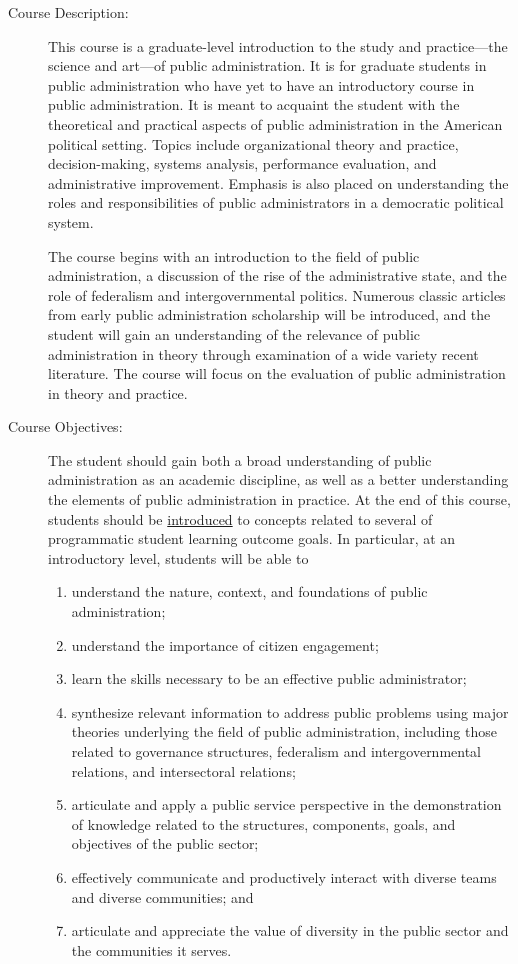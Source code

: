 \documentclass[11pt]{article}
\begin{document}
\maketitle
\begin{description}
	
	\item[Course Description:] This course is a graduate-level introduction to the study and practice---the science and art---of public administration. It is for graduate students in public administration who have yet to have an introductory course in public administration. It is meant to acquaint the student with the theoretical and practical aspects of public administration in the American political setting. Topics include organizational theory and practice, decision-making, systems analysis, performance evaluation, and administrative improvement. Emphasis is also placed on understanding the roles and responsibilities of public administrators in a democratic political system.
	
	The course begins with an introduction to the field of public administration, a discussion of the rise of the administrative state, and the role of federalism and intergovernmental politics. Numerous classic articles from early public administration scholarship will be introduced, and the student will gain an understanding of the relevance of public administration in theory through examination of a wide variety recent literature. The course will focus on the evaluation of public administration in theory and practice.
	
	\item[Course Objectives:] The student should gain both a broad understanding of public administration as an academic discipline, as well as a better understanding the elements of public administration in practice. At the end of this course, students should be \underline{introduced} to concepts related to several of programmatic student learning outcome goals. In particular, at an introductory level, students will be able to 
	\begin{enumerate}
		\item understand the nature, context, and foundations of public administration;
		\item understand the importance of citizen engagement;
		\item learn the skills necessary to be an effective public administrator;
		\item synthesize relevant information to address public problems using major theories underlying the field of public administration, including those related to governance structures, federalism and intergovernmental relations, and intersectoral relations; 
		\item articulate and apply a public service perspective in the demonstration of knowledge related to the structures, components, goals, and objectives of the public sector; 
		\item effectively communicate and productively interact with diverse teams and diverse communities; and 
		\item articulate and appreciate the value of diversity in the public sector and the communities it serves.
	\end{enumerate}
	

\end{description}
\end{document}
